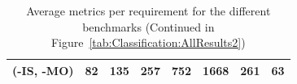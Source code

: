 \begin{landscape}
\begin{table}[!t]
\begin{tabular}{|c|c|c|c|c|c|c|c|}
			(-IS, -MO) & 82           & 135         & 257         & 752         & 1668        & 261         & 63               \\ 
			\hline
	\end{tabular}
		\caption{Average metrics per requirement for the different benchmarks (Continued in Figure~\ref{tab:Classification:AllResults2})}
		\label{tab:Classification:AllResults1}
		\end{table}	
\end{landscape} 
